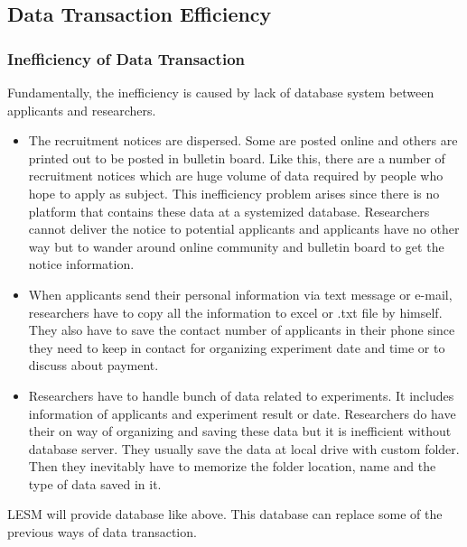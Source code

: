 \documentclass[letterpaper, 10 pt, conference]{ieeeconf}  %
\begin{document}
\subsection{Data Transaction Efficiency\\}
\subsubsection{Inefficiency of Data Transaction\\}
    Fundamentally, the inefficiency is caused by lack of database system between applicants and researchers. 
\begin{itemize}
    \item The recruitment notices are dispersed. Some are posted online and others are printed out to be posted in bulletin board. Like this, there are a number of recruitment notices which are huge volume of data required by people who hope to apply as subject. This inefficiency problem arises since there is no platform that contains these data at a systemized database. Researchers cannot deliver the notice to potential applicants and applicants have no other way but to wander around online community and bulletin board to get the notice information.
    \item When applicants send their personal information via text message or e-mail, researchers have to copy all the information to excel or .txt file by himself. They also have to save the contact number of applicants in their phone since they need to keep in contact for organizing experiment date and time or to discuss about payment. 
    \item Researchers have to handle bunch of data related to experiments. It includes information of applicants and experiment result or date. Researchers do have their on way of organizing and saving these data but it is inefficient without database server. They usually save the data at local drive with custom folder. Then they inevitably have to memorize the folder location, name and the type of data saved in it.  
\end{itemize}


\begin{center}
\end{center}
 LESM will provide database like above. This database can replace some of the previous ways of data transaction. \\
\end{document}
